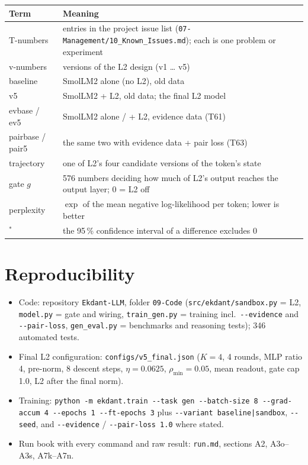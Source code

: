 \documentclass[a4paper,11pt,parskip=half]{scrartcl}
\newcommand{\sig}{\ensuremath{^{\ast}}}
\newcommand{\code}[1]{\texttt{\small #1}}
\begin{document}
\begin{tabularx}{\linewidth}{@{}p{3.2cm}Y@{}}
\toprule
Term & Meaning\\
\midrule
T-numbers & entries in the project issue list (\code{07-Management/10\_Known\_Issues.md}); each is one problem or experiment\\
v-numbers & versions of the L2 design (v1 \dots{} v5)\\
baseline & SmolLM2 alone (no L2), old data\\
v5 & SmolLM2 + L2, old data; the final L2 model\\
evbase / ev5 & SmolLM2 alone / + L2, evidence data (T61)\\
pairbase / pair5 & the same two with evidence data + pair loss (T63)\\
trajectory & one of L2's four candidate versions of the token's state\\
gate $g$ & 576 numbers deciding how much of L2's output reaches the output layer; 0 = L2 off\\
perplexity & $\exp$ of the mean negative log-likelihood per token; lower is better\\
\sig & the 95\,\% confidence interval of a difference excludes 0\\
\bottomrule
\end{tabularx}

\section{Reproducibility}

\begin{itemize}
  \item Code: repository \code{Ekdant-LLM}, folder \code{09-Code} (\code{src/ekdant/sandbox.py} = L2, \code{model.py} = gate and wiring, \code{train\_gen.py} = training incl.\ \code{-{}-evidence} and \code{-{}-pair-loss}, \code{gen\_eval.py} = benchmarks and reasoning tests); 346 automated tests.
  \item Final L2 configuration: \code{configs/v5\_final.json} ($K=4$, 4 rounds, MLP ratio 4, pre-norm, 8 descent steps, $\eta=0.0625$, $\rho_{\min}=0.05$, mean readout, gate cap 1.0, L2 after the final norm).
  \item Training: \code{python -m ekdant.train -{}-task gen -{}-batch-size 8 -{}-grad-accum 4 -{}-epochs 1 -{}-ft-epochs 3} plus \code{-{}-variant baseline|sandbox}, \code{-{}-seed}, and \code{-{}-evidence} / \code{-{}-pair-loss 1.0} where stated.
  \item Run book with every command and raw result: \code{run.md}, sections A2, A3o--A3s, A7k--A7n.
\end{itemize}
\end{document}
